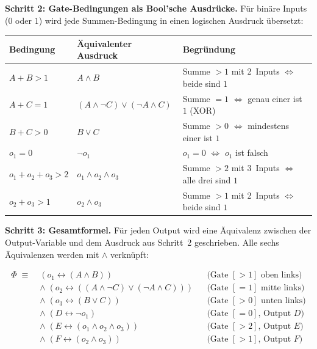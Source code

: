 \documentclass[a4paper,12pt]{article}
\begin{document}
\medskip
\textbf{Schritt 2: Gate-Bedingungen als Bool'sche Ausdr\"ucke.}
F\"ur bin\"are Inputs ($0$ oder $1$) wird jede Summen-Bedingung in
einen logischen Ausdruck \"ubersetzt:

\begin{center}
\renewcommand{\arraystretch}{1.4}
\begin{tabular}{l|l|l}
\toprule
\textbf{Bedingung} & \textbf{\"Aquivalenter Ausdruck} & \textbf{Begr\"undung} \\
\midrule
$A + B > 1$
  & $A \wedge B$
  & Summe $> 1$ mit 2~Inputs $\Leftrightarrow$ beide sind $1$ \\
$A + C = 1$
  & $(A \wedge \neg C) \vee (\neg A \wedge C)$
  & Summe $= 1$ $\Leftrightarrow$ genau einer ist $1$ (XOR) \\
$B + C > 0$
  & $B \vee C$
  & Summe $> 0$ $\Leftrightarrow$ mindestens einer ist $1$ \\
$o_1 = 0$
  & $\neg o_1$
  & $o_1 = 0$ $\Leftrightarrow$ $o_1$ ist falsch \\
$o_1 + o_2 + o_3 > 2$
  & $o_1 \wedge o_2 \wedge o_3$
  & Summe $> 2$ mit 3~Inputs $\Leftrightarrow$ alle drei sind $1$ \\
$o_2 + o_3 > 1$
  & $o_2 \wedge o_3$
  & Summe $> 1$ mit 2~Inputs $\Leftrightarrow$ beide sind $1$ \\
\bottomrule
\end{tabular}
\end{center}

\medskip
\textbf{Schritt 3: Gesamtformel.}
F\"ur jeden Output wird eine \"Aquivalenz zwischen der
Output-Variable und dem Ausdruck aus Schritt~2 geschrieben. Alle
sechs \"Aquivalenzen werden mit $\wedge$ verkn\"upft:

\begin{align*}
\Phi \;\equiv\; & (o_1 \leftrightarrow (A \wedge B))
  && \text{(Gate $[>1]$ oben links)} \\
& \wedge\; (o_2 \leftrightarrow ((A \wedge \neg C) \vee (\neg A \wedge C)))
  && \text{(Gate $[=1]$ mitte links)} \\
& \wedge\; (o_3 \leftrightarrow (B \vee C))
  && \text{(Gate $[>0]$ unten links)} \\
& \wedge\; (D \leftrightarrow \neg o_1)
  && \text{(Gate $[=0]$, Output $D$)} \\
& \wedge\; (E \leftrightarrow (o_1 \wedge o_2 \wedge o_3))
  && \text{(Gate $[>2]$, Output $E$)} \\
& \wedge\; (F \leftrightarrow (o_2 \wedge o_3))
  && \text{(Gate $[>1]$, Output $F$)}
\end{align*}
\end{document}
